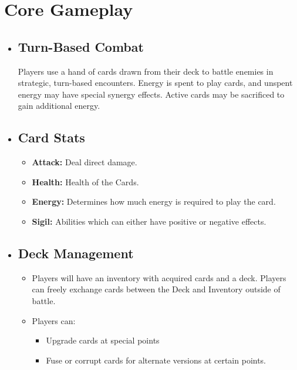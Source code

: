 \documentclass[10pt, a4paper]{article}
\begin{document}
	\section{Core Gameplay}
	\begin{itemize}
		\item \subsection{Turn-Based Combat} Players use a hand of cards drawn from their deck to battle enemies in strategic, turn-based encounters. Energy is spent to play cards, and unspent energy may have special synergy effects. Active cards may be sacrificed to gain additional energy.
		
		\item \subsection{Card Stats}
		\begin{itemize}
			\item \textbf{Attack:} Deal direct damage.
			\item \textbf{Health:} Health of the Cards.
			\item \textbf{Energy:} Determines how much energy is required to play the card.
			\item \textbf{Sigil:} Abilities which can either have positive or negative effects.
		\end{itemize}
		
		\item \subsection{Deck Management} 
		\begin{itemize}
		\item Players will have an inventory with acquired cards and a deck. Players can freely exchange cards between the Deck and Inventory outside of battle.
		\item Players can:
		\begin{itemize}
			\item Upgrade cards at special points
			\item Fuse or corrupt cards for alternate versions at certain points.
		\end{itemize}
	    \end{itemize}
	    

\end{itemize}
\end{document}
